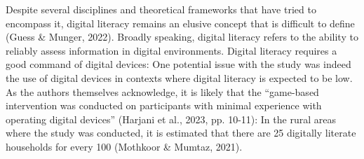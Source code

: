\documentclass[authordate, reflection]{jote-new-article}
\begin{document}
	Despite several disciplines and theoretical frameworks that have tried to encompass it, digital literacy remains an elusive concept that is difficult to define (Guess \& Munger, 2022). Broadly speaking, digital literacy refers to the ability to reliably assess information in digital environments. Digital literacy requires a good command of digital devices: One potential issue with the study was indeed the use of digital devices in contexts where digital literacy is expected to be low. As the authors themselves acknowledge, it is likely that the “game-based intervention was conducted on participants with minimal experience with operating digital devices” (Harjani et al., 2023, pp. 10-11): In the rural areas where the study was conducted, it is estimated that there are 25 digitally literate households for every 100 (Mothkoor \& Mumtaz, 2021).
\end{document}
